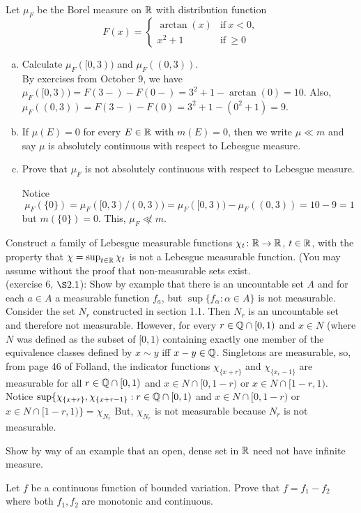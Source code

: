 \begin{list}
\item Let $\mu_F$ be the Borel measure on ${\mathbb R}$ with distribution function
\[
F(x) = 
\begin{cases}
  \arctan (x) & \text{if}\ x<0, \\
  x^2 +1          & \text{if}\ \geq 0
\end{cases}
\]
\begin{enumerate}[(a)] %
\item Calculate $\mu_F([0,3))$ and $\mu_F((0,3))$.\\
By exercises from October 9, we have $\mu_F([0, 3)) = F(3-) - F(0-) = 3^2 + 1 - \arctan(0) = 10$. Also, $\mu_F((0, 3)) = F(3-) - F(0) =3^2 +1 - (0^2 + 1) = 9$.
\item 
If $\mu(E)=0$ for every $E \in {\mathbb R}$ with $m(E)=0$, then we write $\mu \ll m$ and say $\mu$ is absolutely continuous with respect to Lebesgue measure.

\item Prove that $\mu_F$ is not absolutely continuous with respect to Lebesgue measure.
\begin{pf}
	Notice 
	\[
	\mu_F(\{0\}) = \mu_F([0,3) \slash (0,3)) = \mu_F([0,3)) - \mu_F ((0,3)) = 10-9 =1
	\]
	but $m(\{0\})=0$. This, $\mu_F \not \ll m$. 
\end{pf}

\end{enumerate}

\item Construct a family of Lebesgue measurable functions $\chi_t \colon {\mathbb R} \rightarrow {\mathbb R}$, $t \in {\mathbb R}$, with the property that $\chi = \sup _{t\in {\mathbb R}} \chi_t $ is not a Lebesgue measurable function. (You may assume without the proof that non-measurable sets exist. 
\\
(exercise 6, $\S 2.1$): Show by example that there is an uncountable set $A$ and for each $a \in A$ a measurable function $f_a$, but $\sup \{f_\alpha : \alpha \in A\}$ is not measurable.  \\	
Consider the set $N_r$ constructed in section 1.1.  Then $N_r$ is an uncountable set and therefore not measurable. However, for every $r \in {\mathbb Q}\cap[0,1)$ and $x \in N$ (where $N$ was defined as the subset of $[0,1)$ containing exactly one member of the equivalence classes defined by $x \sim y$ iff $x-y \in {\mathbb Q}$. Singletons are measurable, so, from page 46 of Folland, the indicator functions $\chi_{\{x+r\}}$ and $\chi_{\{x_r-1\}}$ are measurable for all $r \in {\mathbb Q}\cap [0,1)$ and $x \in N\cap [0,1-r)$ or $x \in N\cap [1-r,1)$. Notice $\sup\{ \chi_{\{x+r\}}, \chi_{\{x+r-1\}}: r \in {\mathbb Q}\cap [0,1)$ and $x \in N\cap [0,1-r)$ or $x \in N\cap [1-r,1) \}=\chi_{N_r}$ But, $ \chi_{N_r}$ is not measurable because $N_r$ is not measurable. 
\item Show by way of an example that an open, dense set in ${\mathbb R}$ need not have infinite measure.


\item Let $f$ be a continuous function of bounded variation. Prove that $f=f_1-f_2$ where both $f_1, f_2$ are monotonic and continuous. 

\end{list}
